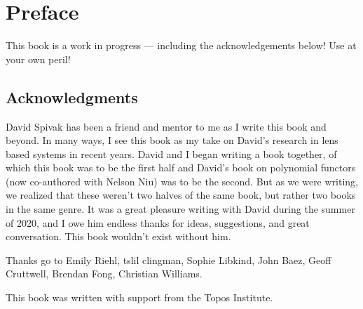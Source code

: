 \documentclass[DynamicalBook]{subfiles}
\begin{document}
%


\setcounter{chapter}{0}%


\chapter{Preface}\label{chapter.0}

This book is a work in progress --- including the acknowledgements below! Use at your own peril!

\section*{Acknowledgments}

David Spivak has been a friend and mentor to me as I write this book and beyond.
In many ways, I see this book as my take on David's research in lens based
systems in recent years. David and I began writing a book together, of which
this book was to be the first half and David's book on polynomial functors (now
co-authored with Nelson Niu) was to be the second. But as we were writing, we
realized that these weren't two halves of the same book, but rather two books
in the same genre. It was a great pleasure writing with David during the summer
of 2020, and I owe him endless thanks for ideas, suggestions, and great
conversation. This book wouldn't exist without him.



Thanks go to Emily Riehl, tslil clingman, Sophie Libkind, John Baez, Geoff Cruttwell, Brendan
Fong, Christian Williams.

This book was written with support from the Topos Institute.
\end{document}
